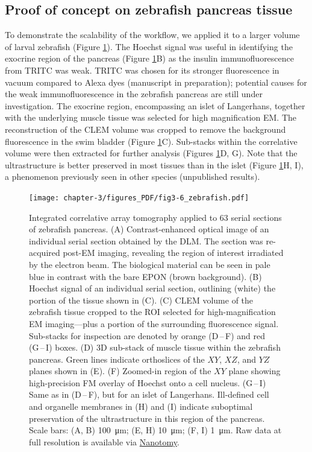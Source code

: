 \subsection{Proof of concept on zebrafish pancreas tissue}
\label{sec:3R_zfpancreas}
To demonstrate the scalability of the workflow, we applied it to a larger volume of larval zebrafish (Figure \ref{fig:3.6_zfpancreas}). The Hoechst signal was useful in identifying the exocrine region of the pancreas (Figure \ref{fig:3.6_zfpancreas}B) as the insulin immunofluorescence from TRITC was weak. TRITC was chosen for its stronger fluorescence in vacuum compared to Alexa dyes (manuscript in preparation); potential causes for the weak immunofluorescence in the zebrafish pancreas are still under investigation. The exocrine region, encompassing an islet of Langerhans, together with the underlying muscle tissue was selected for high magnification EM. The reconstruction of the CLEM volume was cropped to remove the background fluorescence in the swim bladder (Figure \ref{fig:3.6_zfpancreas}C). Sub-stacks within the correlative volume were then extracted for further analysis (Figures \ref{fig:3.6_zfpancreas}D, G). Note that the ultrastructure is better preserved in most tissues than in the islet (Figure \ref{fig:3.6_zfpancreas}H, I), a phenomenon previously seen in other species (unpublished results).

\begin{figure}[!tb]
    \centering
    \texttt{[image: chapter-3/figures\_PDF/fig3-6\_zebrafish.pdf]}
    \caption{Integrated correlative array tomography applied to 63 serial sections of zebrafish pancreas.
    (A) Contrast-enhanced optical image of an individual serial section obtained by the DLM. The section was re-acquired post-EM imaging, revealing the region of interest irradiated by the electron beam. The biological material can be seen in pale blue in contrast with the bare EPON (brown background).
    (B) Hoechst signal of an individual serial section, outlining (white) the portion of the tissue shown in (C).
    (C) CLEM volume of the zebrafish tissue cropped to the ROI selected for high-magnification EM imaging—plus a portion of the surrounding fluorescence signal. Sub-stacks for inspection are denoted by orange (D\,--\,F) and red (G\,--\,I) boxes.
    (D) 3D sub-stack of muscle tissue within the zebrafish pancreas. Green lines indicate orthoslices of the $XY$, $XZ$, and $YZ$ planes shown in (E).
    (F) Zoomed-in region of the $XY$ plane showing high-precision FM overlay of Hoechst onto a cell nucleus. (G\,--\,I) Same as in (D\,--\,F), but for an islet of Langerhans. Ill-defined cell and organelle membranes in (H) and (I) indicate suboptimal preservation of the ultrastructure in this region of the pancreas.
    Scale bars: (A, B) \SI{100}{\micro\meter}; (E, H) \SI{10}{\micro\meter}; (F, I) \SI{1}{\micro\meter}.
    Raw data at full resolution is available via \href{www.nanotomy.org}{Nanotomy}.}
    \label{fig:3.6_zfpancreas}
\end{figure}

